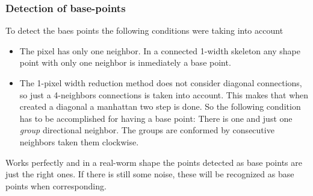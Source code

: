 \documentclass{article}
\begin{document}
\subsubsection{Detection of base-points}
To detect the baes points the following conditions were taking into account
\begin{itemize}
\item The pixel has only one neighbor. In a connected 1-width skeleton
  any shape point with only one neighbor is inmediately a base point.
\item The 1-pixel width reduction method does not consider diagonal connections,
  so just a 4-neighbors connections is taken into account. This makes that when
  created a diagonal a manhattan two step is done. So the following condition
  has to be accomplished for having a base point: There is one and just one 
  \emph{group} directional neighbor. The groups are conformed by consecutive
  neighbors taken them clockwise.
\end{itemize}

Works perfectly and in a real-worm shape the points detected as base points are
just the right ones. If there is still some noise, these will be recognized
as base points when corresponding.
\end{document}
